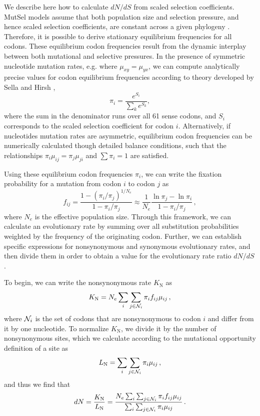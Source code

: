 \documentclass{pnastwo}
\begin{document}
We describe here how to calculate $dN/dS$ from scaled selection coefficients. MutSel models assume that both population size and selection pressure, and hence scaled selection coefficients, are constant across a given phylogeny \cite{HalpernBruno1998,YangNielsen2008,Rodrigueetal2010,Tamurietal2014}. Therefore, it is possible to derive stationary equilibrium frequencies for all codons. These equilibrium codon frequencies result from the dynamic interplay between both mutational and selective pressures. In the presence of symmetric nucleotide mutation rates, e.g. where $\mu_{xy} = \mu_{yx}$, we can compute analytically precise values for codon equilibrium frequencies according to theory developed by Sella and Hirsh \cite{SellaHirsh2005}, \begin{equation} \pi_i=\frac{e^{S_i}}{\sum_k e^{S_k}}, \end{equation} where the sum in the denominator runs over all 61 sense codons, and $S_i$ corresponds to the scaled selection coefficient for codon $i$. Alternatively, if nucleotides mutation rates are asymmetric, equilibrium codon frequencies can be numerically calculated though detailed balance conditions, such that the relationships 
 $\pi_i\mu_{ij} = \pi_j\mu_{ji}$ and $\sum\pi_i = 1$ are satisfied.
 
Using these equilibrium codon frequencies $\pi_i$, we can write the fixation probability for a mutation from codon $i$ to codon $j$ as \cite{HalpernBruno1998,SellaHirsh2005}
\begin{equation}\label{eq:f_ij}
 f_{ij} = \frac{1-(\pi_i/\pi_j)^{1/N_e}}{1-\pi_i/\pi_j}
  \approx \frac{1}{N_e} \frac{\ln \pi_j - \ln \pi_i}{1-\pi_i/\pi_j}\,,
\end{equation}
where $N_e$ is the effective population size. Through this framework, we can calculate an evolutionary rate by summing over all substitution probabilities weighted by the frequency of the originating codon. Further, we can establish specific expressions for nonsynonymous and synonymous evolutionary rates, and then divide them in order to obtain a value for the evolutionary rate ratio $dN/dS$.

To begin, we can write the nonsynonymous rate $K_\text{N}$ as 
\begin{equation}\label{eq:KN}
  K_\text{N} = N_e \sum_i \sum_{j \in {\cal N}_i} \pi_i  f_{ij}\mu_{ij}\,,
\end{equation}
where ${\cal N}_i$ is the set of codons that are nonsynonymous to codon $i$ and differ from it by one nucleotide. To normalize $K_\text{N}$, we divide it by the number of nonsynonymous sites, which we calculate according to the mutational opportunity definition of a site \cite{GoldmanYang1994, Yang2006} as 
\begin{equation}\label{eq:LN}
  L_\text{N} = \sum_i \sum_{j \in {\cal N}_i} \pi_i \mu_{ij}\,, 
\end{equation} and thus we find that 
\begin{equation}\label{eq:dN}
  dN = \frac{K_\text{N}}{L_\text{N}}=\frac{ N_e \sum_i \sum_{j \in {\cal N}_i} \pi_i f_{ij} \mu_{ij} } {\sum_i \sum_{j \in {\cal N}_i} \pi_i \mu_{ij} }\,.
\end{equation}
\end{document}
